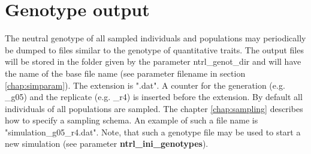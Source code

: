\documentclass[letterpaper,12pt,oneside]{book}
\begin{document}
\section{Genotype output}\label{genoNTRL}
The neutral genotype of all sampled individuals and populations may periodically be dumped to files similar to the genotype of quantitative traits. The output files will be stored in the folder given by the parameter \textsf{ntrl\_genot\_dir} and will have the name of the base file name (see parameter \textsf{filename} in section \ref{chap:simparam}). The extension is ".dat". A counter for the generation (e.g. \_g05) and the replicate (e.g. \_r4) is inserted before the extension. By default all individuals of all populations are sampled. The chapter \ref{chap:sampling} describes how to specify a sampling schema. An example of such a file name is \textsf{"simulation\_g05\_r4.dat"}. Note, that such a genotype file may be used to start a new simulation (see parameter \textbf{ntrl\_ini\_genotypes}).
\end{document}
